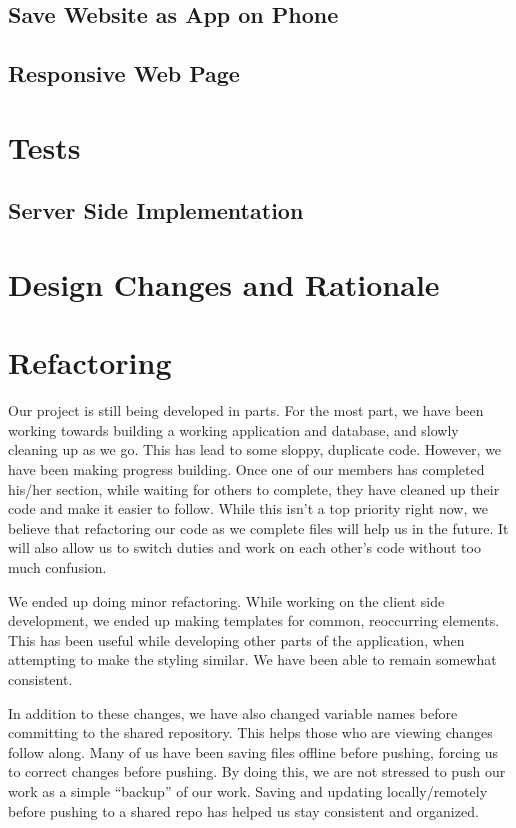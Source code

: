 \documentclass[12pt]{article}
\begin{document}
      \subsection{Save Website as App on Phone}

      \subsection{Responsive Web Page}

\section{Tests}
\subsection{Server Side Implementation}

\section{Design Changes and Rationale}

\section{Refactoring}

    Our project is still being developed in parts. For the most part, we have been working towards building a working application and database, and slowly cleaning up as we go. This has lead to some sloppy, duplicate code. However, we have been making progress building. Once one of our members has completed his/her section, while waiting for others to complete, they have cleaned up their code and make it easier to follow. While this isn’t a top priority right now, we believe that refactoring our code as we complete files will help us in the future. It will also allow us to switch duties and work on each other's code without too much confusion.

    We ended up doing minor refactoring. While working on the client side development, we ended up making templates for common, reoccurring elements. This has been useful while developing other parts of the application, when attempting to make the styling similar. We have been able to remain somewhat consistent.

    In addition to these changes, we have also changed variable names before committing to the shared repository. This helps those who are viewing changes follow along. Many of us have been saving files offline before pushing, forcing us to correct changes before pushing. By doing this, we are not stressed to push our work as a simple “backup” of our work. Saving and updating locally/remotely before pushing to a shared repo has helped us stay consistent and organized.
\end{document}
